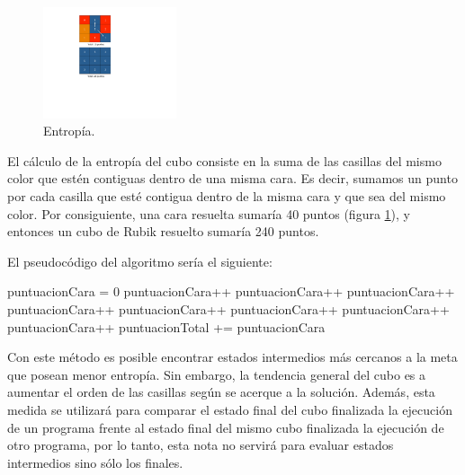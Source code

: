\begin{figure}[t]
\centering
\includegraphics[width=0.35\textwidth]{figs/pdf/entropia}
\caption{Entropía.}
\label{fig:entropia}
\end{figure}

El cálculo de la entropía del cubo consiste en la suma de las casillas del mismo
color que estén contiguas dentro de una misma cara. Es decir, sumamos un punto
por cada casilla que esté contigua dentro de la misma cara y que sea del mismo
color. Por consiguiente, una cara resuelta sumaría 40 puntos
(figura \ref{fig:entropia}), y entonces un cubo de Rubik resuelto sumaría 240
puntos.

El pseudocódigo del algoritmo sería el siguiente:


\begin{algorithmic}
	\STATE puntuacionCara = $0$
				\STATE puntuacionCara++
		\ENDIF
				\STATE puntuacionCara++
		\ENDIF
				\STATE puntuacionCara++
		\ENDIF
				\STATE puntuacionCara++
		\ENDIF
				\STATE puntuacionCara++
		\ENDIF
				\STATE puntuacionCara++
		\ENDIF
				\STATE puntuacionCara++
		\ENDIF
				\STATE puntuacionCara++
		\ENDIF
	\ENDFOR 
	\STATE puntuacionTotal += puntuacionCara
\ENDFOR 
\end{algorithmic}

Con este método es posible encontrar estados intermedios más cercanos a la meta
que posean menor entropía. Sin embargo, la tendencia general del cubo es a
aumentar el orden de las casillas según se acerque a la solución. Además, esta
medida se utilizará para comparar el estado final del cubo finalizada la
ejecución de un programa frente al estado final del mismo cubo finalizada la
ejecución de otro programa, por lo tanto, esta nota no servirá para evaluar
estados intermedios sino sólo los finales.
 
